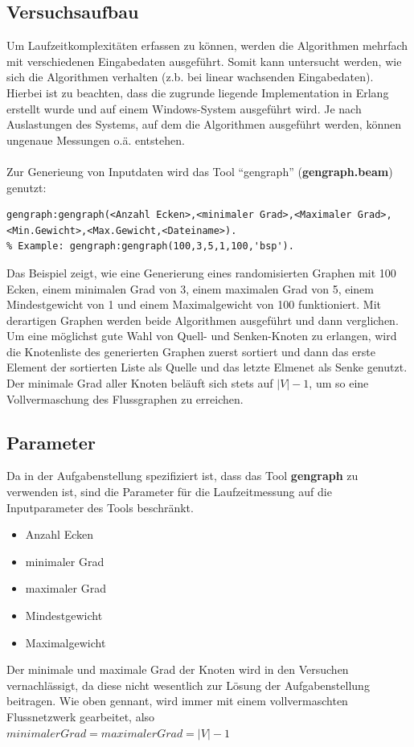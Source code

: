 \documentclass[11pt]{article}
\begin{document}
    \subsection{Versuchsaufbau}
    Um Laufzeitkomplexit\"aten erfassen zu k\"onnen, werden die Algorithmen mehrfach mit verschiedenen Eingabedaten ausgef\"uhrt. Somit kann untersucht werden, wie sich die Algorithmen verhalten (z.b. bei linear wachsenden Eingabedaten). Hierbei ist zu beachten, dass die zugrunde liegende Implementation in Erlang erstellt wurde und auf einem Windows-System ausgef\"uhrt wird. Je nach Auslastungen des Systems, auf dem die Algorithmen ausgef\"uhrt werden, k\"onnen ungenaue Messungen o.\"a. entstehen.\\~\\
    Zur Generieung von Inputdaten wird das Tool "`gengraph"' (\textbf{gengraph.beam}) genutzt:
\begin{lstlisting}
gengraph:gengraph(<Anzahl Ecken>,<minimaler Grad>,<Maximaler Grad>,<Min.Gewicht>,<Max.Gewicht,<Dateiname>).
% Example: gengraph:gengraph(100,3,5,1,100,'bsp').
\end{lstlisting}
    Das Beispiel zeigt, wie eine Generierung eines randomisierten Graphen mit 100 Ecken, einem minimalen Grad von 3, einem maximalen Grad von 5, einem Mindestgewicht von 1 und einem Maximalgewicht von 100 funktioniert. Mit derartigen Graphen werden beide Algorithmen ausgef\"uhrt und dann verglichen. Um eine m\"oglichst gute Wahl von Quell- und Senken-Knoten zu erlangen, wird die Knotenliste des generierten Graphen zuerst sortiert und dann das erste Element der sortierten Liste als Quelle und das letzte Elmenet als Senke genutzt. Der minimale Grad aller Knoten bel\"auft sich stets auf $|V|-1$, um so eine Vollvermaschung des Flussgraphen zu erreichen.

    \subsection{Parameter}
    Da in der Aufgabenstellung spezifiziert ist, dass das Tool \textbf{gengraph} zu verwenden ist, sind die Parameter f\"ur die Laufzeitmessung auf die Inputparameter des Tools beschr\"ankt.
    \begin{itemize}
        \item Anzahl Ecken
        \item minimaler Grad
        \item maximaler Grad
        \item Mindestgewicht
        \item Maximalgewicht
    \end{itemize}
    Der minimale und maximale Grad der Knoten wird in den Versuchen vernachl\"assigt, da diese nicht wesentlich zur L\"osung der Aufgabenstellung beitragen. Wie oben gennant, wird immer mit einem vollvermaschten Flussnetzwerk gearbeitet, also\\ $minimaler Grad = maximaler Grad = |V| - 1$
\end{document}
